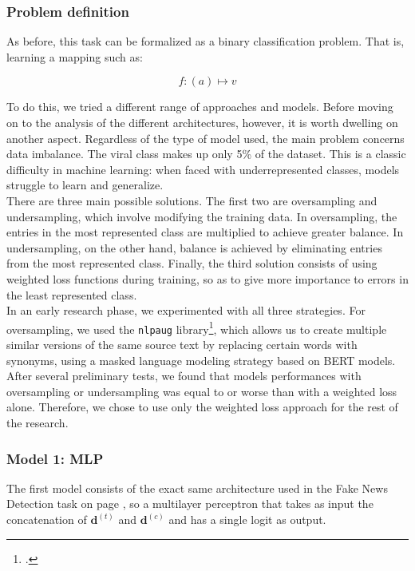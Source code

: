 \documentclass[a4paper,twoside,12pt]{book}
\begin{document}
\subsubsection*{Problem definition}

As before, this task can be formalized as a binary classification problem. That is, learning a mapping such as:

\[
f: (a) \mapsto v
\]

To do this, we tried a different range of approaches and models. Before moving on to the analysis of the different architectures, however, it is worth dwelling on another aspect. Regardless of the type of model used, the main problem concerns data imbalance. The viral class makes up only 5\% of the dataset. This is a classic difficulty in machine learning: when faced with underrepresented classes, models struggle to learn and generalize. \\
There are three main possible solutions. The first two are oversampling and undersampling, which involve modifying the training data. In oversampling, the entries in the most represented class are multiplied to achieve greater balance. In undersampling, on the other hand, balance is achieved by eliminating entries from the most represented class. Finally, the third solution consists of using weighted loss functions during training, so as to give more importance to errors in the least represented class.\\

In an early research phase, we experimented with all three strategies. For oversampling, we used the \texttt{nlpaug} library\footcite{ma2019nlpaug}, which allows us to create multiple similar versions of the same source text by replacing certain words with synonyms, using a masked language modeling strategy based on BERT models. 	\\
After several preliminary tests, we found that models performances with oversampling or undersampling was equal to or worse than with a weighted loss alone. Therefore, we chose to use only the weighted loss approach for the rest of the research.

\subsubsection*{Model 1: MLP}

The first model consists of the exact same architecture used in the Fake News Detection task on page \pageref{evons_detection}, so a multilayer perceptron that takes as input the concatenation of $\mathbf{d}^{(t)}$ and $\mathbf{d}^{(c)}$ and has a single logit as output.
\end{document}
